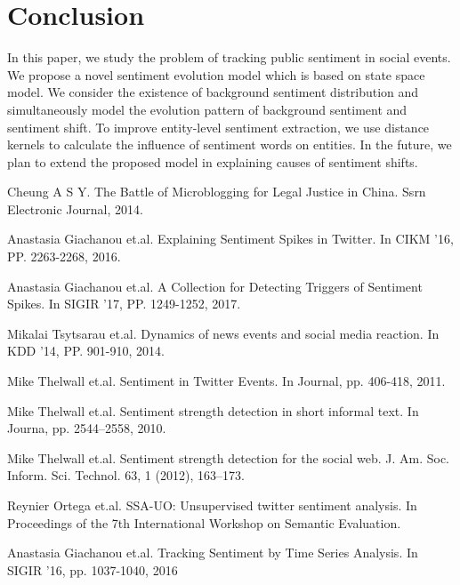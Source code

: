 \documentclass[runningheads]{llncs}
\begin{document}
\section{Conclusion}\label{sec:conclusion}
In this paper, we study the problem of tracking public sentiment in social events. We propose a novel sentiment evolution model which is based on state space model. We consider the existence of background sentiment distribution and simultaneously model the evolution pattern of background sentiment and sentiment shift. To improve entity-level sentiment extraction, we use distance kernels to calculate the influence of sentiment words on entities. In the future, we plan to extend the proposed model in explaining causes of sentiment shifts.

\begin{thebibliography}{8}

Cheung A S Y. 
\newblock The Battle of Microblogging for Legal Justice in China. 
\newblock Ssrn Electronic Journal, 2014.

Anastasia Giachanou et.al.
\newblock  Explaining Sentiment Spikes in Twitter.
\newblock In CIKM ’16, PP. 2263-2268, 2016.

Anastasia Giachanou et.al.
\newblock  A Collection for Detecting Triggers of Sentiment Spikes.
\newblock In SIGIR ’17, PP. 1249-1252, 2017.

Mikalai Tsytsarau et.al.
\newblock  Dynamics of news events and social media reaction.
\newblock In KDD ’14, PP. 901-910, 2014.

Mike Thelwall et.al.
\newblock Sentiment in Twitter Events.
\newblock In Journal, pp. 406-418, 2011.

Mike Thelwall et.al.
\newblock Sentiment strength detection in short informal text.
\newblock In Journa, pp. 2544–2558, 2010.

Mike Thelwall et.al.
\newblock Sentiment strength detection for the social web.
\newblock J. Am. Soc. Inform. Sci. Technol. 63, 1 (2012), 163–173.

Reynier Ortega et.al.
\newblock SSA-UO: Unsupervised twitter sentiment analysis.
\newblock In Proceedings of the 7th International Workshop on Semantic Evaluation.

Anastasia Giachanou et.al.
\newblock Tracking Sentiment by Time Series Analysis.
\newblock In SIGIR ’16, pp. 1037-1040, 2016


\end{thebibliography}
\end{document}
